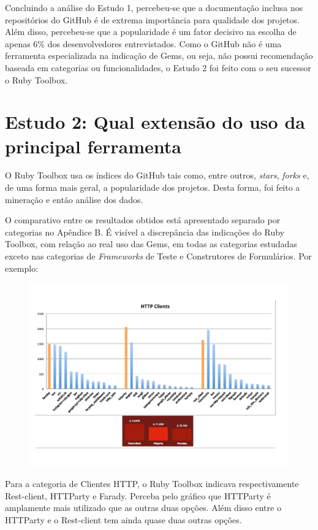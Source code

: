 Concluindo a análise do Estudo 1, percebeu-se que a documentação inclusa nos repositórios do GitHub é de extrema importância para qualidade dos projetos. Além disso, percebeu-se que a popularidade é um fator decisivo na escolha de apenas 6\% dos desenvolvedores entrevistados. Como o GitHub não é uma ferramenta especializada na indicação de Gems, ou seja, não possui recomendação baseada em categorias ou funcionalidades, o Estudo 2 foi feito com o seu sucessor o Ruby Toolbox.

\section{Estudo 2: Qual extensão do uso da principal ferramenta}

O Ruby Toolbox usa os índices do GitHub tais como, entre outros, \textit{stars}, \textit{forks} e, de uma forma mais geral, a popularidade dos projetos. Desta forma, foi feito a mineração e então análise dos dados.

O comparativo entre os resultados obtidos está apresentado separado por categorias no Apêndice B. É visível a discrepância das indicações do Ruby Toolbox, com relação ao real uso das Gems, em todas as categorias estudadas exceto nas categorias de \textit{Frameworks} de Teste e Construtores de Formulários. Por exemplo:

\begin{figure}[H]
\centering
\includegraphics[width=15cm]{Imagens/gems-3.jpg}
\end{figure}

Para a categoria de Clientes HTTP, o Ruby Toolbox indicava respectivamente Rest-client, HTTParty e Farady. Perceba pelo gráfico que HTTParty é amplamente mais utilizado que as outras duas opções. Além disso entre o HTTParty e o Rest-client tem ainda quase duas outras opções.

